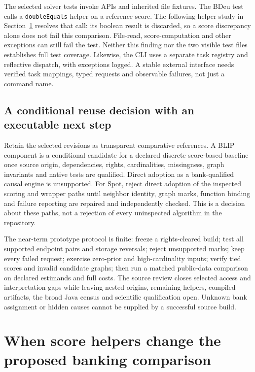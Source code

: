 The selected solver tests invoke APIs and inherited file fixtures. The BDeu
test calls a \texttt{doubleEquals} helper on a reference score. The following
helper study in Section~\ref{sec:exec28-blip-helpers} resolves that call: its
boolean result is discarded, so a score discrepancy alone does not fail this
comparison. File-read, score-computation and other exceptions can still fail
the test. Neither this finding nor the two visible test files establishes
full test coverage. Likewise, the CLI uses
a separate task registry and reflective dispatch, with exceptions logged. A
stable external interface needs verified task mappings, typed requests and
observable failures, not just a command name.~\citep{exec28_nested_sources}

\subsection{A conditional reuse decision with an executable next step}
Retain the selected revisions as transparent comparative references. A BLIP
component is a conditional candidate for a declared discrete score-based
baseline once source origin, dependencies, rights, cardinalities, missingness,
graph invariants and native tests are qualified. Direct adoption as a
bank-qualified causal engine is unsupported. For Spot, reject direct adoption
of the inspected scoring and wrapper paths until neighbor identity, graph
marks, function binding and failure reporting are repaired and independently
checked. This is a decision about these paths, not a rejection of every
uninspected algorithm in the repository.~\citep{exec28_nested_sources}

The near-term prototype protocol is finite: freeze a rights-cleared build;
test all supported endpoint pairs and storage reversals; reject unsupported
marks; keep every failed request; exercise zero-prior and high-cardinality
inputs; verify tied scores and invalid candidate graphs; then run a matched
public-data comparison on declared estimands and full costs. The source
review closes selected access and interpretation gaps while leaving nested
origins, remaining helpers, compiled artifacts, the broad Java census and
scientific qualification open. Unknown bank assignment or hidden causes
cannot be supplied by a successful source build.~\citep{exec28_nested_sources}



\section{When score helpers change the proposed banking comparison}
\label{sec:exec28-blip-helpers}

